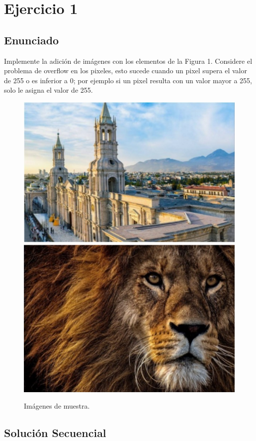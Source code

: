 \documentclass[https://www.overleaf.com/project/63761df255a8a9f4a15c3579
	letterpaper, %
	10pt, %
]{CSUniSchoolLabReport}
\begin{document}

\section*{Ejercicio 1 }

\subsection*{Enunciado}
Implemente la adición de imágenes con los elementos de la Figura 1. Considere el problema de overflow en los pixeles, esto sucede cuando un pixel supera el valor de 255 o es inferior a 0; por ejemplo si un pixel resulta con un valor mayor a 255, solo le asigna el valor de 255.

\begin{figure}[H]
    \centering 
    \includegraphics[width=.4\textwidth]{images/5.jpg}
    \includegraphics[width=.38\textwidth]{images/6.jpg}
    \caption{Imágenes de muestra.}
    \label{fig}
\end{figure}
\subsection*{Solución Secuencial}


\end{document}

